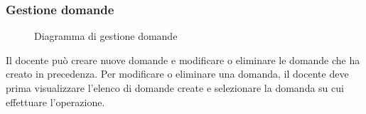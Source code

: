\documentclass[a4paper, titlepage]{article}
\begin{document}
\newpage
\subsubsection{Gestione domande}
\begin{figure}[H]
	\centering
	\noindent{}
	\caption{Diagramma di gestione domande}
\end{figure}
Il docente può creare nuove domande e modificare o eliminare le domande che ha creato in precedenza. Per modificare o eliminare una domanda, il docente deve prima visualizzare l’elenco di domande create e selezionare la domanda su cui effettuare l’operazione.
\end{document}
